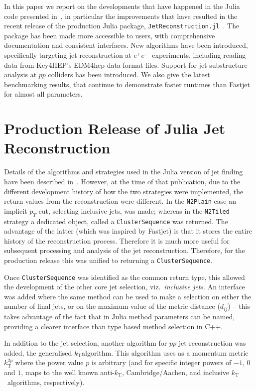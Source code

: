 \documentclass{webofc}
\newcommand{\kt}{${k}_\text{T}$}
\newcommand{\akt}{anti-${k}_\text{T}$}
\newcommand{\JR}{\texttt{JetReconstruction.jl}}
\newcommand{\ee}{$e^+e^-$}
\begin{document}
In this paper we report on the developments that have happened in the Julia code
presented in~\cite{polyglot-jets-chep23}, in particular the improvements that
have resulted in the recent release of the production Julia package,
\JR~\cite{jetreconstruction-jl-github}. The package has been made more
accessible to users, with comprehensive documentation and consistent interfaces.
New algorithms have been introduced, specifically targeting jet reconstruction at
\ee\ experiments, including reading data from Key4HEP's EDM4hep data format
files. Support for jet substructure analysis at $pp$ colliders has been
introduced. We also give the latest benchmarking results, that continue to
demonstrate faster runtimes than Fastjet~\cite{Cacciari:2011ma} for almost all
parameters.

\section{Production Release of Julia Jet Reconstruction}
\label{sec:prodrel}

Details of the algorithms and strategies used in the Julia version of jet
finding have been described in~\cite{polyglot-jets-chep23}. However, at the time
of that publication, due to the different development history of how the two
strategies were implemented, the return values from the reconstruction were
different. In the \texttt{N2Plain} case an implicit $p_T$ cut, selecting
inclusive jets, was made; whereas in the \texttt{N2Tiled} strategy a dedicated
object, called a \texttt{ClusterSequence} was returned. The advantage of the
latter (which was inspired by Fastjet) is that it stores the entire history of
the reconstruction process. Therefore it is much more useful for subsequent
processing and analysis of the jet reconstruction. Therefore, for the production
release this was unified to returning a \texttt{ClusterSequence}.

Once \texttt{ClusterSequence} was identified as the common return type, this
allowed the development of the other core jet selection, viz.\ \emph{inclusive
jets}. An interface was added where the same method can be used to make a
selection on either the number of final jets, or on the maximum value of the
metric distance ($d_{ij}$) -- this takes advantage of the fact that in Julia
method parameters can be named, providing a clearer interface than type based
method selection in C++.

In addition to the jet selection, another algorithm for $pp$ jet reconstruction
was added, the generalised \kt algorithm. This algorithm uses as a momentum
metric $k^{2p}_\text{T}$ where the power value $p$ is arbitrary (and for
specific integer powers of $-1$, $0$ and $1$, maps to the well known \akt,
Cambridge/Aachen, and inclusive \kt\ algorithms, respectively).
\end{document}
